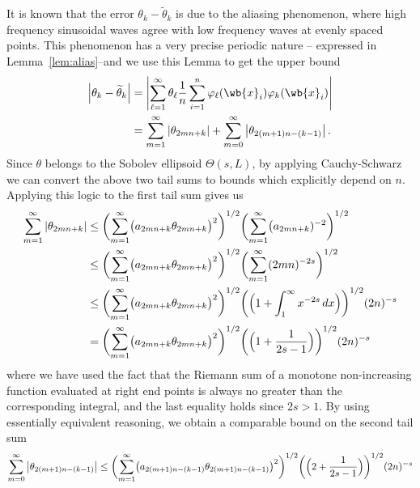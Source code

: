 \documentclass{article}
\newcommand{\abs}[1]{\left \lvert #1 \right \rvert}
\newcommand{\1}{\mathbf{1}}
\newcommand{\wt}[1]{\widetilde{#1}}
\theoremstyle{alden}
\theoremstyle{aldenthm}
\theoremstyle{definition}
\theoremstyle{remark}
\begin{document}
It is known that the error $\theta_k - \wt{\theta}_k$ is due to the aliasing phenomenon, where high frequency sinusoidal waves agree with low frequency waves at evenly spaced points. This phenomenon has a very precise periodic nature -- expressed in Lemma~\ref{lem:alias}--and we use this Lemma to get the upper bound
\begin{align*}
\abs{{\theta}_k - \wt{\theta}_k} & = \abs{\sum_{\ell = 1}^{\infty} \theta_{\ell} \frac{1}{n} \sum_{i = 1}^{n} \varphi_{\ell}(\wb{x}_i) \varphi_{k}(\wb{x}_i)} \\
& = \sum_{m = 1}^{\infty} \abs{\theta_{2mn + k}} + \sum_{m = 0}^{\infty}\abs{\theta_{2(m + 1)n - (k - 1)}}.
\end{align*}
Since $\theta$ belongs to the Sobolev ellipsoid $\Theta(s,L)$, by applying Cauchy-Schwarz we can convert the above two tail sums to bounds which explicitly depend on $n$. Applying this logic to the first tail sum gives us
\begin{align}
\sum_{m = 1}^{\infty} \abs{\theta_{2mn + k}} & \leq \biggl(\sum_{m = 1}^{\infty} \bigl(a_{2mn + k}\theta_{2mn + k}\bigr)^2\biggr)^{1/2} \biggl(\sum_{m = 1}^{\infty} \bigl(a_{2mn + k})^{-2}\biggr)^{1/2}\nonumber \\
& \leq \biggl(\sum_{m = 1}^{\infty} \bigl(a_{2mn + k}\theta_{2mn + k}\bigr)^2\biggr)^{1/2} \biggl( \sum_{m = 1}^{\infty} (2mn)^{-2s}\biggr)^{1/2} \nonumber \\
& \leq \biggl(\sum_{m = 1}^{\infty} \bigl(a_{2mn + k}\theta_{2mn + k}\bigr)^2\biggr)^{1/2} \biggl( \Bigl(1 + \int_{1}^{\infty} x^{-2s} \,dx \Bigr) \biggr)^{1/2} (2n)^{-s}   \nonumber \\
& = \biggl(\sum_{m = 1}^{\infty} \bigl(a_{2mn + k}\theta_{2mn + k}\bigr)^2\biggr)^{1/2} \biggl( \Bigl(1 + \frac{1}{2s - 1} \Bigr) \biggr)^{1/2} (2n)^{-s}\label{eqn:grid_sobolev_approximation_error5_pf3}
\end{align}
where we have used the fact that the Riemann sum of a monotone non-increasing function evaluated at right end points is always no greater than the corresponding integral, and the last equality holds since $2s > 1$. By using essentially equivalent reasoning, we obtain a comparable bound on the second tail sum
\begin{equation*}
\sum_{m = 0}^{\infty}\abs{\theta_{2(m + 1)n - (k - 1)}} \leq \biggl(\sum_{m = 1}^{\infty} \bigl(a_{2(m + 1)n - (k - 1)}\theta_{2(m + 1)n - (k - 1)}\bigr)^2\biggr)^{1/2} \biggl( \Bigl(2 + \frac{1}{2s - 1} \Bigr) \biggr)^{1/2} (2n)^{-s}
\end{equation*}
\end{document}
